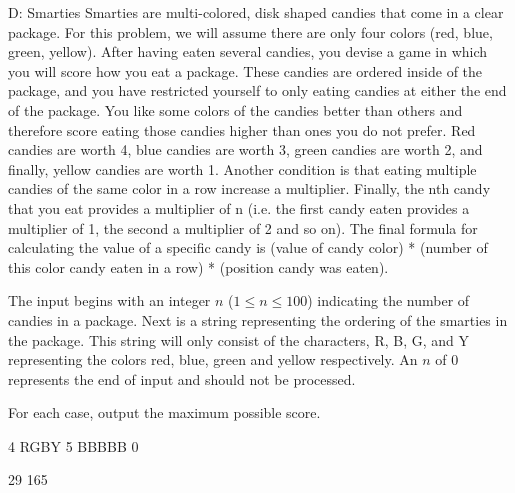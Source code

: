 \begin{problem}{D: Smarties}
Smarties are multi-colored, disk shaped candies that come in a clear package. For this problem, we will assume there are only four colors (red, blue, green, yellow). After having eaten several candies, you devise a game in which you will score how you eat a package. These candies are ordered inside of the package, and you have restricted yourself to only eating candies at either the end of the package. You like some colors of the candies better than others and therefore score eating those candies higher than ones you do not prefer. Red candies are worth 4, blue candies are worth 3, green candies are worth 2, and finally, yellow candies are worth 1. Another condition is that eating multiple candies of the same color in a row increase a multiplier. Finally, the nth candy that you eat provides a multiplier of n (i.e. the first candy eaten provides a multiplier of 1, the second a multiplier of 2 and so on). The final formula for calculating the value of a specific candy is (value of candy color) * (number of this color candy eaten in a row) * (position candy was eaten).
\end{problem}

\begin{formalin}
The input begins with an integer $n$ ($1 \leq n \leq 100$) indicating the number of candies in a package. Next is a string representing the ordering of the smarties in the package. This string will only consist of the characters, R, B, G, and Y representing the colors red, blue, green and yellow respectively. An $n$ of 0 represents the end of input and should not be processed.
\end{formalin}

\begin{formalout}
For each case, output the maximum possible score.
\end{formalout}

\begin{datain}
4
RGBY
5
BBBBB
0
\end{datain}

\begin{dataout}
29
165
\end{dataout}

